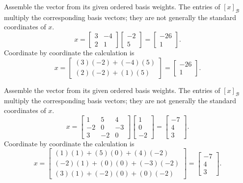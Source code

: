 \goal Assemble the vector from its given ordered basis weights.
The entries of $[x]_{\mathcal B}$ multiply the corresponding basis vectors; they are not generally the standard coordinates of $x$.
\[x=\left[\begin{array}{rr}3&-4\\2&1\end{array}\right]\left[\begin{array}{r}-2\\5\end{array}\right]=\left[\begin{array}{r}-26\\1\end{array}\right].\]
Coordinate by coordinate the calculation is
\[x=\begin{bmatrix}(3)(-2)+(-4)(5)\\(2)(-2)+(1)(5)\end{bmatrix}=\left[\begin{array}{r}-26\\1\end{array}\right].\]

\goal Assemble the vector from its given ordered basis weights.
The entries of $[x]_{\mathcal B}$ multiply the corresponding basis vectors; they are not generally the standard coordinates of $x$.
\[x=\left[\begin{array}{rrr}1&5&4\\-2&0&-3\\3&-2&0\end{array}\right]\left[\begin{array}{r}1\\0\\-2\end{array}\right]=\left[\begin{array}{r}-7\\4\\3\end{array}\right].\]
Coordinate by coordinate the calculation is
\[x=\begin{bmatrix}(1)(1)+(5)(0)+(4)(-2)\\(-2)(1)+(0)(0)+(-3)(-2)\\(3)(1)+(-2)(0)+(0)(-2)\end{bmatrix}=\left[\begin{array}{r}-7\\4\\3\end{array}\right].\]

